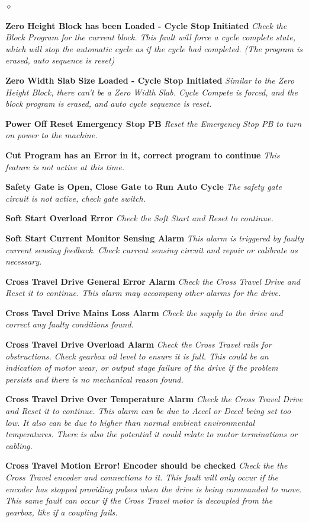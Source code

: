 \begin{list}{$\diamond$}{}
	\item \textbf{Zero Height Block has been Loaded - Cycle Stop Initiated} \textit{Check the Block Program for the current block. This fault will force a cycle complete state, which will stop the automatic cycle as if the cycle had completed. (The program is erased, auto sequence is reset)}
	\item \textbf{Zero Width Slab Size Loaded - Cycle Stop Initiated} \textit{Similar to the Zero Height Block, there can't be a Zero Width Slab. Cycle Compete is forced, and the block program is erased, and auto cycle sequence is reset.}
	\item \textbf{Power Off Reset Emergency Stop PB} \textit{Reset the Emergency Stop PB to turn on power to the machine.}
	\item \textbf{Cut Program has an Error in it, correct program to continue} \textit{This feature is not active at this time.}
	\item \textbf{Safety Gate is Open, Close Gate to Run Auto Cycle} \textit{The safety gate circuit is not active, check gate switch.}
	\item \textbf{Soft Start Overload Error} \textit{Check the Soft Start and Reset to continue.}
	\item \textbf{Soft Start Current Monitor Sensing Alarm} \textit{This alarm is triggered by faulty current sensing feedback. Check current sensing circuit and repair or calibrate as necessary.}
	\item \textbf{Cross Travel Drive General Error Alarm} \textit{Check the Cross Travel Drive and Reset it to continue. This alarm may accompany other alarms for the drive.}
	\item \textbf{Cross Tavel Drive Mains Loss Alarm} \textit{Check the supply to the drive and correct any faulty conditions found.}
	\item \textbf{Cross Travel Drive Overload Alarm} \textit{Check the Cross Travel rails for obstructions. Check gearbox oil level to ensure it is full. This could be an indication of motor wear, or output stage failure of the drive if the problem persists and there is no mechanical reason found.}
	\item \textbf{Cross Travel Drive Over Temperature Alarm} \textit{Check the Cross Travel Drive and Reset it to continue. This alarm can be due to Accel or Decel being set too low. It also can be due to higher than normal ambient environmental temperatures. There is also the potential it could relate to motor terminations or cabling.}
	\item \textbf{Cross Travel Motion Error! Encoder should be checked} \textit{Check the the Cross Travel encoder and connections to it. This fault will only occur if the encoder has stopped providing pulses when the drive is being commanded to move. This same fault can occur if the Cross Travel motor is decoupled from the gearbox, like if a coupling fails.}

\end{list}
